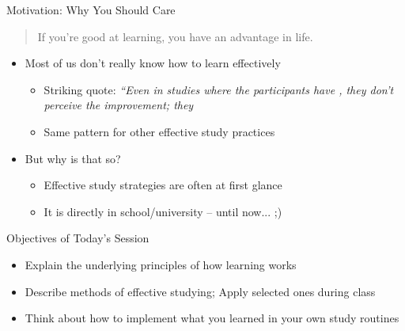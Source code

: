 \documentclass{ercisbeamer}
\begin{document}
\begin{frame}{Motivation: Why You Should Care}
    \begin{quote}
    If you're good at learning, you have an advantage in life. 
    \end{quote}
    \vspace{1em}
    \begin{itemize}
        \item Most of us don't really know how to learn effectively
        \begin{itemize}
            \item Striking quote: \emph{``Even in studies where the participants have , they don't perceive the improvement; they  }
            \item Same pattern for other effective study practices
        \end{itemize}
        \item But why is that so?
        \begin{itemize}
            \item Effective study strategies are often  at first glance
            \item It is  directly  in school/university -- until now... ;)
        \end{itemize}
    \end{itemize}
\end{frame}

\begin{frame}{Objectives of Today's Session}
    \begin{itemize}
        \item Explain the underlying principles of how learning works
        \item Describe methods of effective studying; Apply selected ones during class
        \item Think about how to implement what you learned in your own study routines
    \end{itemize}
\end{frame}
\end{document}

